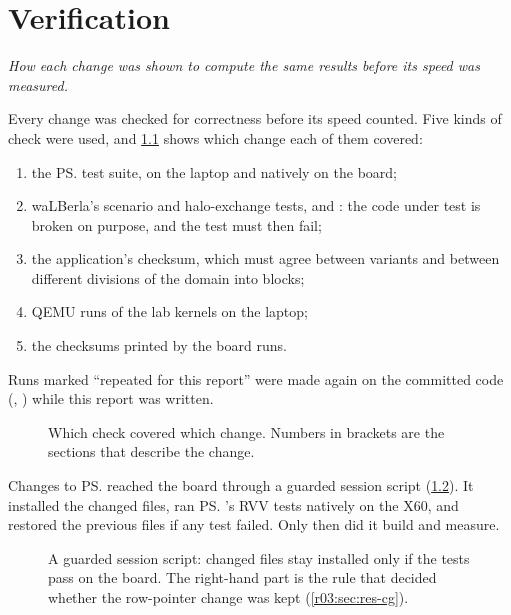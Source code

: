 \chapter{Verification}\label{r03:ch:verification}

\emph{How each change was shown to compute the same results before its speed was measured.}

Every change was checked for correctness before its speed counted. Five kinds of check were
used, and \cref{r03:fig:vermap} shows which change each of them covered:
\begin{enumerate}
  \item the \ps{} test suite, on the laptop and natively on the board;
  \item waLBerla's scenario and halo-exchange tests, and : the code under
        test is broken on purpose, and the test must then fail;
  \item the application's checksum, which must agree between variants and between different
        divisions of the domain into blocks;
  \item QEMU runs of the lab kernels on the laptop;
  \item the checksums printed by the board runs.
\end{enumerate}
Runs marked ``repeated for this report'' were made again on the committed code (\rcommitps,
\rcommitwl) while this report was written.

\begin{figure}[htbp]
  \centering
  \resizebox{\linewidth}{!}{}
  \caption[Which check covered which change]{Which check covered which change. Numbers in brackets
    are the sections that describe the change.}\label{r03:fig:vermap}
\end{figure}

Changes to \ps{} reached the board through a guarded session script
(\cref{r03:fig:jobflow}). It installed the changed files, ran \ps{}'s RVV tests natively on the
X60, and restored the previous files if any test failed. Only then did it build and measure.

\begin{figure}[htbp]
  \centering
  
  \caption[A guarded session script]{A guarded session script: changed files stay installed
    only if the tests pass on the board. The right-hand part is the rule that decided whether
    the row-pointer change was kept (\cref{r03:sec:res-cg}).}\label{r03:fig:jobflow}
\end{figure}

